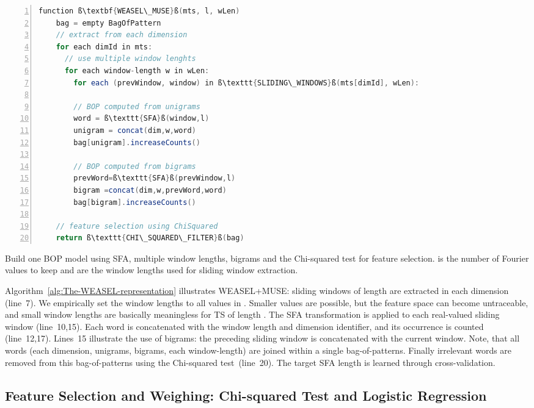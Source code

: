 \documentclass[sigconf]{acmart}
\begin{document}
\begin{algorithm}[t]
	\begin{lstlisting}[language=Java,numbers=left,basicstyle={\sffamily},breaklines=true,showstringspaces=false,tabsize=2,numbersep=1em,xleftmargin=2em,xrightmargin=0em,emph={function, in, all, each, to},emphstyle={\textbf},escapechar={ß}]
function ß\textbf{WEASEL\_MUSE}ß(mts, l, wLen)
	bag = empty BagOfPattern
	// extract from each dimension
	for each dimId in mts:
	  // use multiple window lenghts
	  for each window-length w in wLen:
	    for each (prevWindow, window) in ß\texttt{SLIDING\_WINDOWS}ß(mts[dimId], wLen):
	
	    // BOP computed from unigrams
	    word = ß\texttt{SFA}ß(window,l)
	    unigram = concat(dim,w,word)
    	bag[unigram].increaseCounts()
	
	    // BOP computed from bigrams
    	prevWord=ß\texttt{SFA}ß(prevWindow,l)	
    	bigram =concat(dim,w,prevWord,word)
    	bag[bigram].increaseCounts()
    	
	// feature selection using ChiSquared
	return ß\texttt{CHI\_SQUARED\_FILTER}ß(bag)
	\end{lstlisting}
	
	\caption{Build one BOP model using SFA,
		multiple window lengths, bigrams and the Chi-squared test for feature
		selection.  is the number of Fourier values to keep and  are the window lengths used for sliding window extraction.\label{alg:The-WEASEL-representation}}
\end{algorithm}

Algorithm~\ref{alg:The-WEASEL-representation} illustrates WEASEL+MUSE: sliding windows of length  are extracted in each dimension (line~7). We empirically set the window lengths to all values in . Smaller values are possible, but the feature space can become untraceable, and small window lengths are basically meaningless for TS of length .
The SFA transformation is applied to each real-valued sliding window (line~10,15). Each word is concatenated with the window length and dimension identifier, and its occurrence is counted (line~12,17). Lines~15 illustrate the use of bigrams: the preceding sliding window is concatenated with the current window. Note, that all words (each dimension, unigrams, bigrams, each window-length) are joined within a single bag-of-patterns. 
Finally irrelevant words are removed from this bag-of-patterns using the Chi-squared test~(line~20). The target SFA length  is learned through cross-validation.


\subsection{Feature Selection and Weighing: Chi-squared Test and Logistic Regression}\label{subsec:Chi-Squared-Test}
\end{document}
